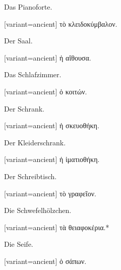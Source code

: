 Das Pianoforte.

\switchcolumn

\begin{greek}[variant=ancient]%
τὸ κλειδοκύμβαλον.

\end{greek}%
\switchcolumn*

Der Saal.

\switchcolumn

\begin{greek}[variant=ancient]%
ἡ αἴθουσα.

\end{greek}%
\switchcolumn*

Das Schlafzimmer.

\switchcolumn

\begin{greek}[variant=ancient]%
ὁ κοιτών.

\end{greek}%
\switchcolumn*

Der Schrank.

\switchcolumn

\begin{greek}[variant=ancient]%
ἡ σκευοθήκη.

\end{greek}%
\switchcolumn*

Der Kleiderschrank.

\switchcolumn

\begin{greek}[variant=ancient]%
ἡ ἱματιοθήκη.

\end{greek}%
\switchcolumn*

Der Schreibtisch.

\switchcolumn

\begin{greek}[variant=ancient]%
τὸ γραφεῖον.

\end{greek}%
\switchcolumn*

Die Schwefelhölzchen.

\switchcolumn

\begin{greek}[variant=ancient]%
τὰ θειαφοκέρια.{*}

\end{greek}%
\switchcolumn*

Die Seife.

\switchcolumn

\begin{greek}[variant=ancient]%
ὁ σάπων.

\end{greek}%
\switchcolumn*

